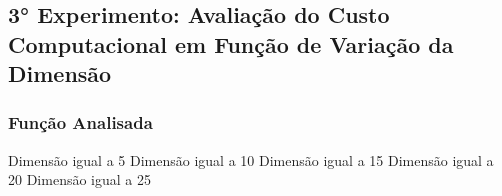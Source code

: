 

\subsection{3° Experimento: Avaliação do Custo Computacional em Função de Variação da Dimensão}
    \subsubsection{Função Analisada}

        \begin{minipage}[h!]{\linewidth}
            \centering
            Dimensão igual a 5
            \label{tab:tblo} 
            \writetable{\tblo}
            \bigskip
            \centering
            Dimensão igual a 10
            \label{tab:tblp} 
            \writetable{\tblp}
            \bigskip
            \centering
            Dimensão igual a 15
            \label{tab:tblq} 
            \writetable{\tblq}
            \bigskip
            \centering
            Dimensão igual a 20
            \label{tab:tblr} 
            \writetable{\tblr}
            \bigskip
            \centering
            Dimensão igual a 25
            \label{tab:tbls} 
            \writetable{\tbls}
        \end{minipage}
    
\newpage